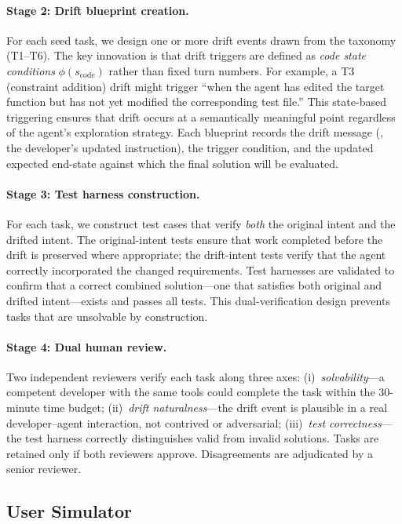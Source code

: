 \paragraph{Stage 2: Drift blueprint creation.}
For each seed task, we design one or more drift events drawn from the taxonomy (T1--T6). The key innovation is that drift triggers are defined as \emph{code state conditions} $\phi(s_{\text{code}})$ rather than fixed turn numbers. For example, a T3 (constraint addition) drift might trigger ``when the agent has edited the target function but has not yet modified the corresponding test file.'' This state-based triggering ensures that drift occurs at a semantically meaningful point regardless of the agent's exploration strategy. Each blueprint records the drift message (\ie, the developer's updated instruction), the trigger condition, and the updated expected end-state against which the final solution will be evaluated.

\paragraph{Stage 3: Test harness construction.}
For each task, we construct test cases that verify \emph{both} the original intent and the drifted intent. The original-intent tests ensure that work completed before the drift is preserved where appropriate; the drift-intent tests verify that the agent correctly incorporated the changed requirements. Test harnesses are validated to confirm that a correct combined solution---one that satisfies both original and drifted intent---exists and passes all tests. This dual-verification design prevents tasks that are unsolvable by construction.

\paragraph{Stage 4: Dual human review.}
Two independent reviewers verify each task along three axes: (i)~\emph{solvability}---a competent developer with the same tools could complete the task within the 30-minute time budget; (ii)~\emph{drift naturalness}---the drift event is plausible in a real developer--agent interaction, not contrived or adversarial; (iii)~\emph{test correctness}---the test harness correctly distinguishes valid from invalid solutions. Tasks are retained only if both reviewers approve. Disagreements are adjudicated by a senior reviewer.

\subsection{User Simulator}
\label{sec:bench-simulator}

